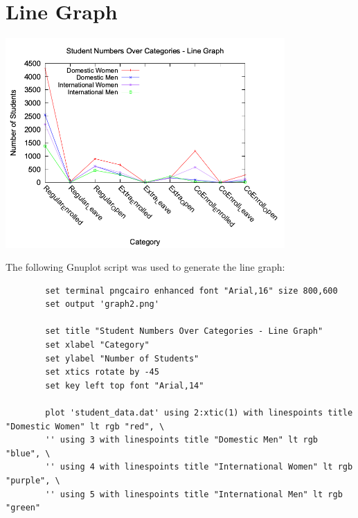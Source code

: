 \documentclass{article}
\begin{document}
	\clearpage %
	
	\section{Line Graph}
	\begin{minipage}{\textwidth}
		\centering
		\includegraphics[width=0.8\textwidth]{graph2.png}
		\label{fig:line}
	\end{minipage}
	
	\vspace{1em}
	
	\noindent The following Gnuplot script was used to generate the line graph:
	\begin{lstlisting}
		set terminal pngcairo enhanced font "Arial,16" size 800,600
		set output 'graph2.png'
		
		set title "Student Numbers Over Categories - Line Graph"
		set xlabel "Category"
		set ylabel "Number of Students"
		set xtics rotate by -45
		set key left top font "Arial,14"
		
		plot 'student_data.dat' using 2:xtic(1) with linespoints title "Domestic Women" lt rgb "red", \
		'' using 3 with linespoints title "Domestic Men" lt rgb "blue", \
		'' using 4 with linespoints title "International Women" lt rgb "purple", \
		'' using 5 with linespoints title "International Men" lt rgb "green"
	\end{lstlisting}
	
	\clearpage
	
\end{document}
